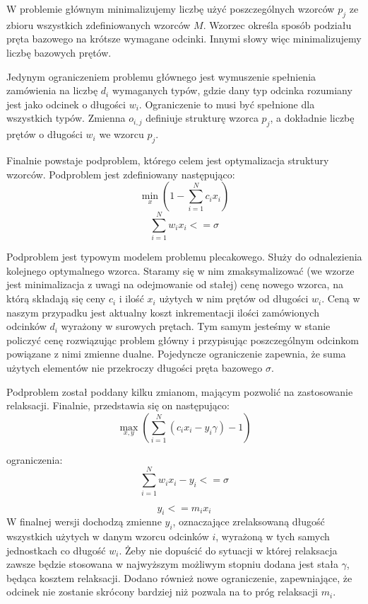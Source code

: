 W problemie głównym minimalizujemy liczbę użyć poszczególnych wzorców \(p_j\) ze zbioru wszystkich zdefiniowanych wzorców \(M\). Wzorzec określa sposób podziału pręta bazowego na krótsze wymagane odcinki. Innymi słowy więc minimalizujemy liczbę bazowych prętów.

Jedynym ograniczeniem problemu głównego jest wymuszenie spełnienia zamówienia na liczbę \(d_i\) wymaganych typów, gdzie dany typ odcinka rozumiany jest jako odcinek o długości \(w_i\). Ograniczenie to musi być spełnione dla wszystkich typów. Zmienna \(o_{i,j}\) definiuje strukturę wzorca \(p_j\), a dokładnie liczbę prętów o długości \(w_i\) we wzorcu \(p_j\).

Finalnie powstaje podproblem, którego celem jest optymalizacja struktury wzorców. Podproblem jest zdefiniowany następująco:
\begin{equation}
   \min_x (1 - \sum_{i=1}^{N} c_i x_i )
\end{equation}
\begin{equation}
    \sum_{i=1}^{N} w_i x_i <= \sigma
\end{equation}


Podproblem jest typowym modelem problemu plecakowego. Służy do odnalezienia kolejnego optymalnego wzorca. Staramy się w nim zmaksymalizować (we wzorze jest minimalizacja z uwagi na odejmowanie od stałej) cenę nowego wzorca, na którą składają się ceny \(c_i\) i ilość \(x_i\) użytych w nim prętów od długości \(w_i\). Ceną w naszym przypadku jest aktualny koszt inkrementacji ilości zamówionych odcinków \(d_i\) wyrażony w surowych prętach. Tym samym jesteśmy w stanie policzyć cenę rozwiązując problem główny i przypisując poszczególnym odcinkom powiązane z nimi zmienne dualne.
Pojedyncze ograniczenie zapewnia, że suma użytych elementów nie przekroczy długości pręta bazowego \(\sigma\).

Podproblem został poddany kilku zmianom, mającym pozwolić na zastosowanie relaksacji. Finalnie, przedstawia się on następująco:
\begin{equation}
    \max_{x,y} (\sum_{i=1}^{N} (c_i x_i - y_i \gamma) - 1)
\label{podproblemRelaks}
\end{equation}

ograniczenia:
\begin{equation}
    \sum_{i=1}^{N} w_i x_i - y_i <= \sigma
\label{ograniczenie1}
\end{equation}

\begin{equation}
    y_i <= m_i x_i
\label{ograniczenie2}
\end{equation}
W finalnej wersji dochodzą zmienne \(y_i\), oznaczające zrelaksowaną długość wszystkich użytych w danym wzorcu odcinków \(i\), wyrażoną w tych samych jednostkach co długość \(w_i\). Żeby nie dopuścić do sytuacji w której relaksacja zawsze będzie stosowana w najwyższym możliwym stopniu dodana jest stała \(\gamma\), będąca kosztem relaksacji. Dodano również nowe ograniczenie, zapewniające, że odcinek nie zostanie skrócony bardziej niż pozwala na to próg relaksacji \(m_i\).

